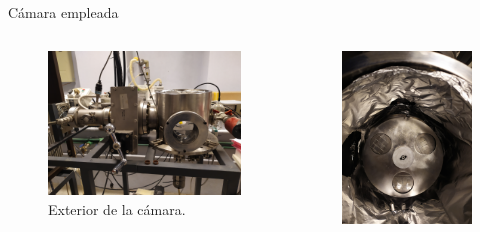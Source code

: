 \documentclass[11pt]{beamer}
\begin{document}
		\begin{frame}{Cámara empleada}
			\begin{columns}[T]
				\begin{column}{.49\textwidth}
					\begin{figure}[H]
					\centering
					\includegraphics[scale=0.04]{img/camara.jpg}
					\caption*{Exterior de la cámara.}
					\end{figure}
				\end{column}
				\begin{column}{.49\textwidth}
					\begin{figure}[H]
					\includegraphics[scale=0.04]{img/muestras.jpg}

\end{figure}
\end{column}
\end{columns}
\end{frame}
\end{document}
